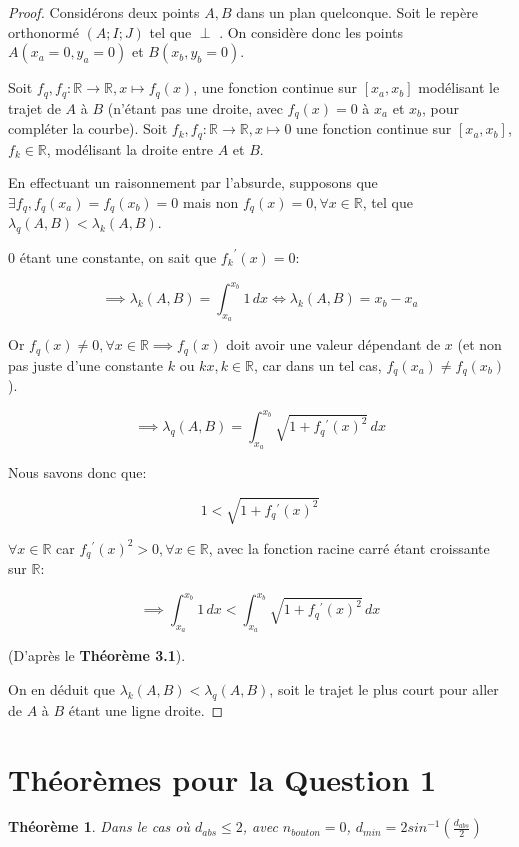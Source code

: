 \documentclass{amsart}
\newtheorem{theorem}{Théorème}[section]
\theoremstyle{definition}
\theoremstyle{remark}
\numberwithin{equation}{section}
\renewcommand*{\overrightarrow}[1]{\vbox{\halign{##\cr 
  \tiny\rightarrowfill\cr\noalign{\nointerlineskip\vskip1pt} 
  $#1\mskip2mu$\cr}}}
\begin{document}
\begin{proof}
  Considérons deux points $A,B$ dans un plan quelconque. Soit le repère orthonormé $(A;I;J)$ tel que \overrightarrow{AJ} $\perp$ \overrightarrow{AB}. On considère donc les points $A(x_a=0,y_a=0)$ et $B(x_b,y_b=0)$.
  
  Soit $f_q, f_q:\mathbb{R}\longrightarrow \mathbb{R}, x\longmapsto f_q(x)$, une fonction continue sur $[x_a,x_b]$ modélisant le trajet de $A$ à $B$ (n'étant pas une droite, avec $f_q(x)=0$ à $x_a$ et $x_b$, pour compléter la courbe). Soit $f_k, f_q:\mathbb{R}\longrightarrow \mathbb{R}, x\longmapsto 0$ une fonction
  continue sur $[x_a,x_b]$, $f_k\in\mathbb{R}$, modélisant la droite entre $A$ et $B$.
  
  En effectuant un raisonnement par l'absurde, supposons que $\exists f_q,f_q(x_a)=f_q(x_b)=0$ mais non $f_q(x)=0, \forall x\in\mathbb{R}$, tel que $\lambda_q(A,B) < \lambda_k(A,B)$.

  $0$ étant une constante, on sait que ${f_k}^\prime(x)=0$:

  \[\implies \lambda_k(A,B)=\int_{x_a}^{x_b}1 \,dx \Leftrightarrow \lambda_k(A,B)= x_b-x_a \]

  Or $f_q(x)\ne 0,\forall x\in\mathbb{R} \implies f_q(x)$ doit avoir une valeur dépendant de $x$ (et non pas juste d'une constante $k$ ou $kx, k\in\mathbb{R}$, car dans un tel cas, $f_q(x_a)\ne f_q(x_b)$). 

  \[\implies \lambda_q(A,B)=\int_{x_a}^{x_b}\sqrt{1+f_q{^\prime}(x)^2} \,dx\]

  Nous savons donc que: 

  \[1 < \sqrt{1+f_q{^\prime}(x)^2}\] 
  
  $\forall x \in \mathbb{R}$ car $f_q{^\prime}(x)^2> 0, \forall x \in \mathbb{R}$, avec la fonction racine carré étant croissante sur $\mathbb{R}$:

  \[\implies \int_{x_a}^{x_b}1 \,dx < \int_{x_a}^{x_b}\sqrt{1+f_q{^\prime}(x)^2} \,dx\] 
  
  (D'après le \textbf{Théorème 3.1}).

  On en déduit que $\lambda_k(A,B) < \lambda_q(A,B)$, soit le trajet le plus court pour aller de $A$ à $B$ étant une ligne droite.
\end{proof}

\section{Théorèmes pour la Question 1}

\begin{theorem}
  Dans le cas où $d_{abs}\le 2$, avec $n_{bouton}=0$, $d_{min}= 2sin^{-1}(\frac{d_{abs}}{2})$
\end{theorem}
\end{document}
